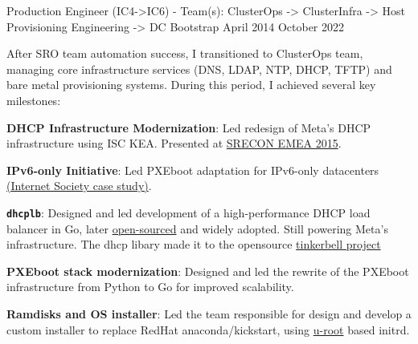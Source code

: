 \begin{cventries}
  \cventryprevrole
  {Production Engineer (IC4->IC6) - Team(s): ClusterOps -> ClusterInfra -> Host Provisioning Engineering -> DC Bootstrap}
  {April 2014 \newline October 2022}
  {
    After SRO team automation success, I transitioned to ClusterOps team, managing core infrastructure
    services (DNS, LDAP, NTP, DHCP, TFTP) and bare metal provisioning systems.
    During this period, I achieved several key milestones:
    \vspace{2mm}
    \begin{cvitems}
      \item {\textbf{DHCP Infrastructure Modernization}: Led redesign of Meta's DHCP infrastructure using ISC KEA.
                  Presented at \href{https://www.usenix.org/conference/srecon15europe/program/presentation/failla}{SRECON EMEA 2015}.}
      \item {\textbf{IPv6-only Initiative}: Led PXEboot adaptation for IPv6-only datacenters
                  \href{https://www.internetsociety.org/resources/deploy360/2014/case-study-facebook-moving-to-an-ipv6-only-internal-network/}{(Internet Society case study)}.}
      \item {\textbf{\texttt{dhcplb}}: Designed and led development of a high-performance DHCP
                  load balancer in Go, later \href{https://engineering.fb.com/2016/09/13/data-infrastructure/dhcplb-an-open-source-load-balancer/}{open-sourced}
                  and widely adopted. Still powering Meta's infrastructure. The dhcp libary made it to the opensource \href{https://tinkerbell.org/}{tinkerbell project}}
      \item {\textbf{PXEboot stack modernization}: Designed and led the rewrite of the PXEboot infrastructure from Python to Go for improved scalability.}
      \item {\textbf{Ramdisks and OS installer}: Led the team responsible for design and develop a custom installer to replace RedHat anaconda/kickstart,
                  using \href{https://github.com/u-root/u-root}{u-root} based initrd.}   \end{cvitems}
  }


\end{cventries}
